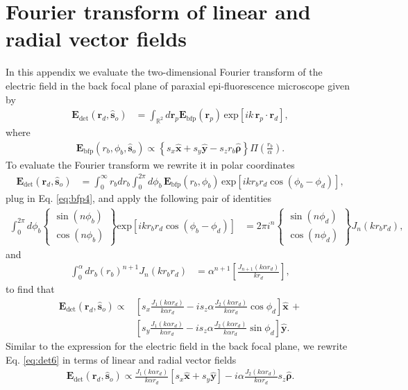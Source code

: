 \documentclass[]{osa-article}
\providecommand{\mb}[1]{\mathbf{#1}}
\providecommand{\so}{\mathbf{\hat{s}}_o}
\providecommand{\rp}{\mathbf{r}_p}
\providecommand{\rd}{\mathbf{r}_d}
\providecommand{\mh}[1]{\mathbf{\hat{#1}}}
\providecommand{\mbb}[1]{\mathbb{#1}}
\providecommand{\bs}[1]{\boldsymbol{#1}}
\begin{document}
\section{Fourier transform of linear and radial vector fields}\label{sec:ftvec}
In this appendix we evaluate the two-dimensional Fourier transform of the
electric field in the back focal plane of paraxial epi-fluorescence microscope
given by
  \begin{align}
  \mb{E}_{\text{det}}(\rd{}, \so{}) &= \int_{\mbb{R}^2}d\rp{} \mb{E}_{\text{bfp}}(\rp{})\, \text{exp}\left[ik\,\rp{}\cdot\rd{}\right],\label{eq:det2}
  \end{align}
where
\begin{align}
  \mb{E}_{\text{bfp}}(r_b, \phi_b, \so{}) \propto \left\{s_x\mh{x} + s_y\mh{y} - s_z r_b \mh{\bs{\rho}}\right\}\Pi\left(\frac{r_b}{\alpha}\right). \label{eq:bfp4}
\end{align}
To evaluate the Fourier transform we rewrite it in polar coordinates
\begin{align}
\mb{E}_{\text{det}}(\rd{}, \so{}) &= \int_{0}^{\infty}r_bdr_b\int_0^{2\pi} d\phi_b\, \mb{E}_{\text{bfp}}(r_b, \phi_b)\, \text{exp}\left[ikr_b r_d\cos(\phi_b - \phi_d)\right],
\end{align}
plug in Eq. \ref{eq:bfp4}, and apply the following pair of identities
\begin{align}
  \int_0^{2\pi}d\phi_b
  \left\{\substack{
    \sin(n\phi_b)\\
    \cos(n\phi_b)
  }\right\}
  \text{exp}\left[ikr_br_d\cos(\phi_b - \phi_d)\right] &= 2\pi i^n
  \left\{\substack{
    \sin(n\phi_d)\\
    \cos(n\phi_d)
  }\right\}J_n(k r_br_d),
\end{align}
and 
  \begin{align}
  \int_0^{\alpha} dr_b (r_b)^{n+1}J_{n}(kr_br_d) &= \alpha^{n+1}\left[\frac{J_{n+1}(k\alpha r_d)}{k r_d}\right],
  \end{align}
to find that
\begin{align}
  \mb{E}_{\text{det}}(\rd{}, \so{}) \propto &\left[s_x\frac{J_1(k\alpha r_d)}{k\alpha r_d} - is_z\alpha \frac{J_2(k\alpha r_d)}{k\alpha r_d}\cos\phi_d\right]\mh{x}\, + \nonumber \\& \left[s_y\frac{J_1(k\alpha r_d)}{k\alpha r_d} - i s_z\alpha \frac{J_2(k\alpha r_d)}{k\alpha r_d}\sin\phi_d\right]\mh{y}. \label{eq:det6}
\end{align}
Similar to the expression for the electric field in the back focal plane, we
rewrite Eq. \ref{eq:det6} in terms of linear and radial vector fields
\begin{align}
  \mb{E}_{\text{det}}(\rd{}, \so{}) \propto \frac{J_1(k\alpha r_d)}{k\alpha r_d}[s_x\mh{x} + s_y\mh{y}] - i\alpha\frac{J_2(k\alpha r_d)}{k\alpha r_d}s_z\mh{\bs{\rho}}.
\end{align}
\end{document}
